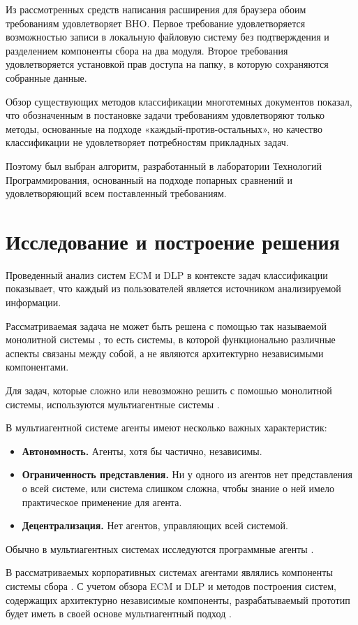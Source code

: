 \documentclass[russian, utf8, emptystyle]{eskdtext}
\begin{document}
Из рассмотренных средств написания расширения для браузера обоим требованиям удовлетворяет BHO. Первое требование удовлетворяется возможностью записи в локальную файловую систему без подтверждения и разделением компоненты сбора на два модуля. Второе требования удовлетворяется установкой прав доступа на папку, в которую сохраняются собранные данные.

Обзор существующих методов классификации многотемных документов показал, что обозначенным в постановке задачи требованиям удовлетворяют только методы, основанные на подходе «каждый-против-остальных», но качество классификации не удовлетворяет потребностям прикладных задач. 

Поэтому был выбран алгоритм, разработанный в лаборатории Технологий Программирования, основанный на подходе попарных сравнений и удовлетворяющий всем поставленный требованиям.


\section {Исследование и построение решения}
Проведенный анализ систем ECM и DLP  в контексте задач классификации показывает, что каждый из пользователей является источником анализируемой информации. 

Рассматриваемая задача не может быть решена с помощью так называемой монолитной системы \cite{monolit}, то есть системы, в которой функционально различные аспекты связаны между собой, а не являются архитектурно независимыми компонентами. 

Для задач, которые сложно или невозможно решить с помошью монолитной системы, используются мультиагентные системы \cite{multiagent,tan}.

В мультиагентной системе агенты имеют несколько важных характеристик:
\begin{itemize}
	\item {\bf Автономность.} Агенты, хотя бы частично, независимы.
	\item {\bf Ограниченность представления.} Ни у одного из агентов нет представления о всей системе, или система слишком сложна, чтобы знание о ней имело практическое применение для агента.
	\item {\bf Децентрализация.} Нет агентов, управляющих всей системой.
\end{itemize}

Обычно в мультиагентных системах исследуются программные агенты \cite{software}. 

В рассматриваемых корпоративных системах агентами являлись компоненты системы сбора \cite{searcher}. С учетом обзора ECM и DLP и методов построения 
систем, содержащих архитектурно независимые компоненты, разрабатываемый прототип будет иметь в своей основе мультиагентный подход \cite{tan}.
\end{document}
